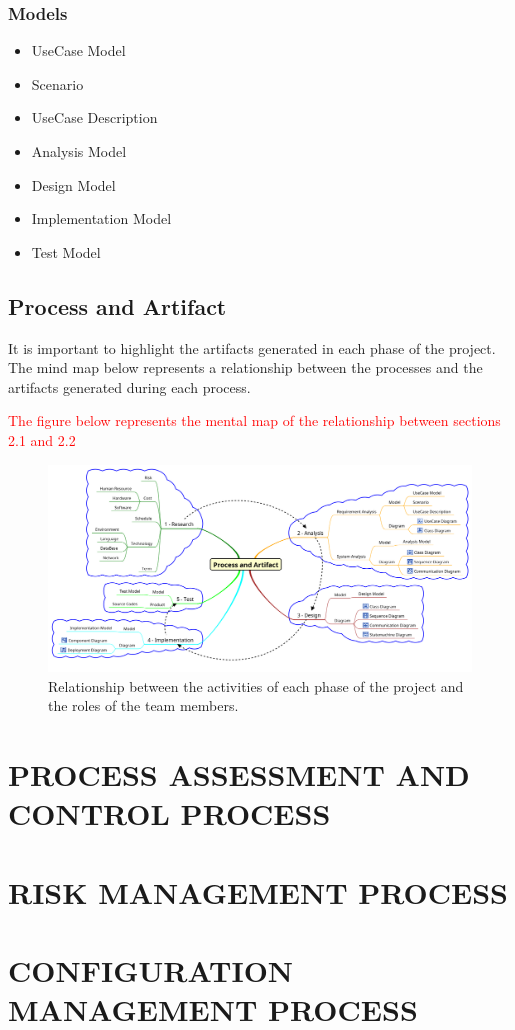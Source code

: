 \documentclass[11pt, twoside, a4paper]{book}
\begin{document}
				\subsection{Models}
				
					\begin{itemize}
						\item UseCase Model
						\item Scenario
						\item UseCase Description						
						\item Analysis Model
						\item Design Model
						\item Implementation Model		
						\item Test Model
					\end{itemize}
			
			\section{Process and Artifact}
				
				It is important to highlight the artifacts generated in each phase of the project. The mind map below represents a relationship between the processes and the artifacts generated during each process.
				
				\begin{landscape}
				\textcolor{Red}{The figure below represents the mental map of the relationship between sections 2.1 and 2.2}
				\begin{figure}[!htb] 
					\center
   					\includegraphics[scale=0.4,bb = 0 0 1545 525]{process-and-artifact.png}
					\textcolor{Red}{\caption{Relationship between the activities of each phase of the project and the roles of the team members.}}
				\end{figure}
			\end{landscape}	
        				
        \chapter{PROCESS ASSESSMENT AND CONTROL PROCESS}
                    
        \chapter{RISK MANAGEMENT PROCESS}
        
        \chapter{CONFIGURATION MANAGEMENT PROCESS}
    
    
\end{document}
